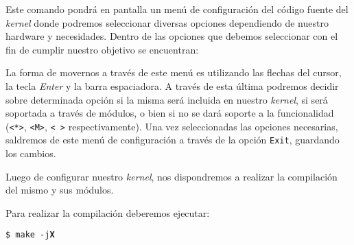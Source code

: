 \begin{questions}
  Este comando pondrá en pantalla un menú
  de configuración del código fuente del \textit{kernel} donde podremos
  seleccionar diversas opciones dependiendo de nuestro hardware y
  necesidades. Dentro de las opciones que debemos seleccionar con el fin de
  cumplir nuestro objetivo se encuentran:

  La forma de movernos a través de este menú es utilizando las flechas del
  cursor, la tecla \textit{Enter} y la barra espaciadora. A través de esta
  última podremos decidir sobre determinada opción si la misma será
  incluida en nuestro \textit{kernel}, si será soportada a través de módulos, o bien
  si no se dará soporte a la funcionalidad (\texttt{<*>}, \texttt{<M>},
  \texttt{< >} respectivamente). Una vez seleccionadas las opciones
  necesarias, saldremos de este menú de configuración a través de la opción
  \texttt{Exit}, guardando los cambios.

  \question Luego de configurar nuestro \textit{kernel}, nos dispondremos a realizar
  la compilación del mismo y sus módulos.
    
  Para realizar la compilación deberemos ejecutar:

  \texttt{\$ make -j\textbf{X}}


\end{questions}
